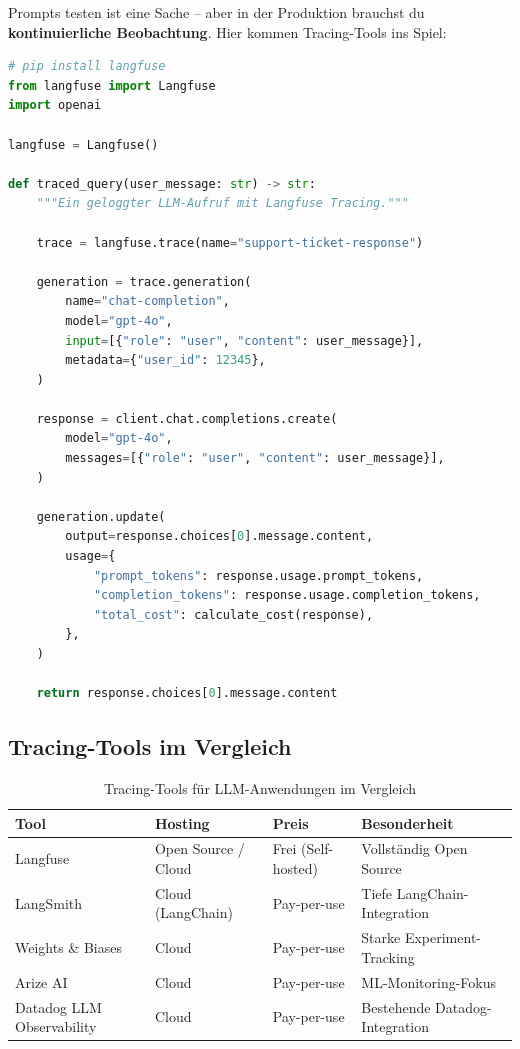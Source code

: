 Prompts testen ist eine Sache -- aber in der Produktion brauchst du \textbf{kontinuierliche Beobachtung}. Hier kommen Tracing-Tools ins Spiel:

\begin{lstlisting}[language=Python, caption=Langfuse Tracing -- jeden LLM-Aufruf protokollieren]
# pip install langfuse
from langfuse import Langfuse
import openai

langfuse = Langfuse()

def traced_query(user_message: str) -> str:
    """Ein geloggter LLM-Aufruf mit Langfuse Tracing."""

    trace = langfuse.trace(name="support-ticket-response")

    generation = trace.generation(
        name="chat-completion",
        model="gpt-4o",
        input=[{"role": "user", "content": user_message}],
        metadata={"user_id": 12345},
    )

    response = client.chat.completions.create(
        model="gpt-4o",
        messages=[{"role": "user", "content": user_message}],
    )

    generation.update(
        output=response.choices[0].message.content,
        usage={
            "prompt_tokens": response.usage.prompt_tokens,
            "completion_tokens": response.usage.completion_tokens,
            "total_cost": calculate_cost(response),
        },
    )

    return response.choices[0].message.content
\end{lstlisting}

\subsection{Tracing-Tools im Vergleich}

\begin{table}[H]
\centering
\begin{tabularx}{\linewidth}{lXXX}
\toprule
\textbf{Tool} & \textbf{Hosting} & \textbf{Preis} & \textbf{Besonderheit} \\
\midrule
Langfuse & Open Source / Cloud & Frei (Self-hosted) & Vollständig Open Source \\
LangSmith & Cloud (LangChain) & Pay-per-use & Tiefe LangChain-Integration \\
Weights \& Biases & Cloud & Pay-per-use & Starke Experiment-Tracking \\
Arize AI & Cloud & Pay-per-use & ML-Monitoring-Fokus \\
Datadog LLM Observability & Cloud & Pay-per-use & Bestehende Datadog-Integration \\
\bottomrule
\end{tabularx}
\caption{Tracing-Tools für LLM-Anwendungen im Vergleich}
\end{table}

